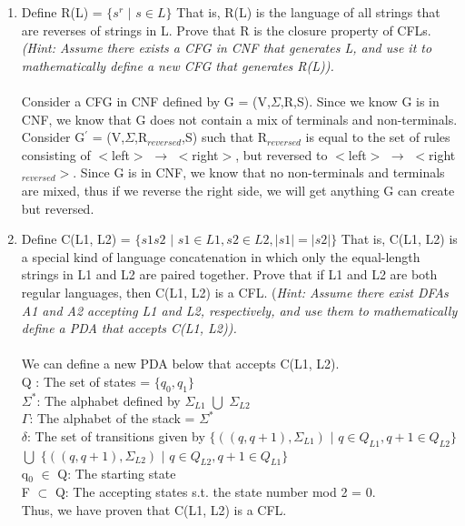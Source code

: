 \documentclass[12pt]{article}
\begin{document}
\begin{enumerate}
	\item Define R(L) = $\{s^r$ $|$ $s \in L\}$ That is, R(L) is the language of all strings that are reverses of strings in L. Prove that R is the closure property of CFLs. \textit{(Hint: Assume there exists a CFG in CNF that generates L, and use it to mathematically define a new CFG that generates R(L)).} \\ \\
	Consider a CFG in CNF defined by G = (V,$\Sigma$,R,S). Since we know G is in CNF, we know that G does not contain a mix of terminals and non-terminals. Consider G$^{'}$ = (V,$\Sigma$,R$_{reversed}$,S) such that R$_{reversed}$ is equal to the set of rules consisting of $<$left$>$ $\rightarrow$ $<$right$>$, but reversed to $<$left$>$ $\rightarrow$ $<$right$_{reversed}>$. Since G is in CNF, we know that no non-terminals and terminals are mixed, thus if we reverse the right side, we will get anything G can create but reversed. \\
	
	\item Define C(L1, L2) = $\{s1s2$ $|$ $s1 \in L1, s2 \in L2, |s1| = |s2| \}$ That is, C(L1, L2) is a special kind of language concatenation in which only the equal-length strings in L1 and L2 are paired together. Prove that if L1 and L2 are both regular languages, then C(L1, L2) is a CFL. (\textit{Hint: Assume there exist DFAs A1 and A2 accepting L1 and L2, respectively, and use them to mathematically define a PDA that accepts C(L1, L2)).} \\ \\
	We can define a new PDA below that accepts C(L1, L2). \\
	Q : The set of states = $\{q_0, q_1\}$ \\
	$\Sigma^*$: The alphabet defined by $\Sigma_{L1}$ $\bigcup$ $\Sigma_{L2}$ \\
	$\Gamma$: The alphabet of the stack = $\Sigma^*$ \\
	$\delta$: The set of transitions given by $\{((q, q+1), \Sigma_{L1})$ $|$ $q \in Q_{L1}, q+1 \in Q_{L2}\}$ $\bigcup$ \tabto{6.15cm} $\{((q, q+1), \Sigma_{L2})$ $|$ $q \in Q_{L2}, q+1 \in Q_{L1}\}$ \\
	q$_0$ $\in$ Q: The starting state \\
	F $\subset$ Q: The accepting states s.t. the state number mod 2 = 0. \\
	Thus, we have proven that C(L1, L2) is a CFL. \\
	

\end{enumerate}
\end{document}
